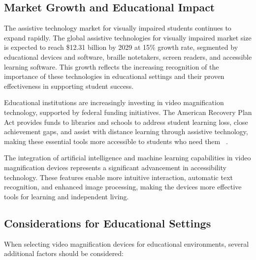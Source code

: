 \subsection{Market Growth and Educational Impact}

The assistive technology market for visually impaired students continues to expand rapidly. The global assistive technologies for visually impaired market size is expected to reach \$12.31 billion by 2029 at 15\% growth rate, segmented by educational devices and software, braille notetakers, screen readers, and accessible learning software. This growth reflects the increasing recognition of the importance of these technologies in educational settings and their proven effectiveness in supporting student success.

Educational institutions are increasingly investing in video magnification technology, supported by federal funding initiatives. The American Recovery Plan Act provides funds to libraries and schools to address student learning loss, close achievement gaps, and assist with distance learning through assistive technology, making these essential tools more accessible to students who need them~ \cite{AmericanRecoveryAct}.

The integration of artificial intelligence and machine learning capabilities in video magnification devices represents a significant advancement in accessibility technology. These features enable more intuitive interaction, automatic text recognition, and enhanced image processing, making the devices more effective tools for learning and independent living.

\subsection{Considerations for Educational Settings}

When selecting video magnification devices for educational environments, several additional factors should be considered:

